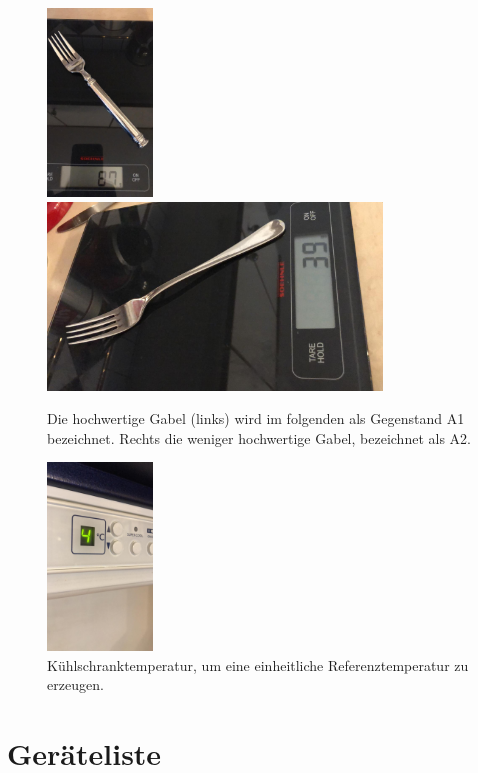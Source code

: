 \documentclass{article}
\begin{document}
\begin{figure}[H]
\includegraphics[height=5cm]{gabel1.jpg}
\includegraphics[height=5cm]{gabel2.jpg}
\caption{Die hochwertige Gabel (links) wird im folgenden als Gegenstand A1 bezeichnet. Rechts die weniger hochwertige Gabel, bezeichnet als A2.}
\end{figure}




\begin{figure}[H]
\includegraphics[height=5cm]{kuehlschrank.jpg}
\caption{Kühlschranktemperatur, um eine einheitliche Referenztemperatur zu erzeugen.}
\label{fig:kuehlschrank}
\end{figure}





\section{Geräteliste}
\end{document}
